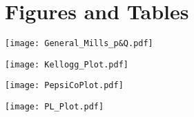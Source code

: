 \documentclass[12pt,english]{article}
\begin{document}
\section*{Figures and Tables}\label{sec:figTables}


\texttt{[image: General\_Mills\_p\&Q.pdf]}

\texttt{[image: Kellogg\_Plot.pdf]}

\texttt{[image: PepsiCoPlot.pdf]}

\texttt{[image: PL\_Plot.pdf]}

\end{document}
